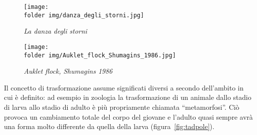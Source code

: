 \begin{figure*}[!htb]
\begin{center}
  \noindent\begin{minipage}{0.485\textwidth}
    \centering
    \texttt{[image: \\folder img/danza\_degli\_storni.jpg]}
    \caption{\emph{La danza degli storni}
      \protect\footnotemark}\label{fig:storni1}
  \end{minipage}
  \hspace{2mm}	
  \noindent\begin{minipage}{0.47\textwidth}
    \centering
    
\texttt{[image: \\folder img/Auklet\_flock\_Shumagins\_1986.jpg]}
    \caption{\emph{Auklet flock, Shumagins 1986}\protect\footnotemark
            }\label{fig:storni2}
  \end{minipage}
\end{center}
\end{figure*}


%
%		
%		

Il concetto di trasformazione assume significati diversi a secondo 
dell'ambito in cui è definito: ad esempio in zoologia la 
trasformazione di un animale dallo stadio di larva allo stadio di 
adulto è più propriamente chiamata ``metamorfosi''. Ciò provoca un 
cambiamento totale del corpo del giovane e l'adulto quasi sempre avrà 
una forma molto differente da quella della larva 
(figura~\ref{fig:tadpole}).

